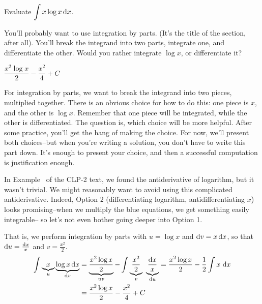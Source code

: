 \begin{Mquestion}[M121 2014A]\label{1.7_xlogx}
Evaluate ${\displaystyle\int x\log x\,\mathrm{d}x}$.
\end{Mquestion}

\begin{hint}
You'll probably want to use integration by parts. (It's the title of the section, after all). You'll break the integrand into two parts, integrate one, and differentiate the other. Would you rather integrate $\log x$, or differentiate it?
\end{hint}

\begin{answer}
$\dfrac{x^2\log x}{2} - \dfrac{x^2}{4} + C$
\end{answer}

\begin{solution}
For integration by parts, we want to break the integrand into two pieces, multiplied together. There is an obvious choice for how to do this: one piece is $x$, and the other is $\log x$. Remember that one piece will be integrated, while the other is differentiated. The question is, which choice will be more helpful. After some practice, you'll get the hang of making the choice. For now, we'll present both choices--but when you're writing a solution, you don't have to write this part down. It's enough to present your choice, and then a successful computation is justification enough.


In Example~ of the CLP-2 text, we found the antiderivative of logarithm, but it wasn't trivial. We might reasonably want to avoid using this complicated antiderivative. Indeed,  Option 2 (differentiating logarithm, antidifferentiating $x$) looks promising--when we multiply the blue equations, we get something easily integrable-- so let's not even bother going deeper into Option 1.

That is, we perform integration by parts with $u=\log x$ and $\mathrm{d}v=x\,\mathrm{d}x$,
so that $\mathrm{d}u=\frac{\mathrm{d}x}{x}$ and $v = \frac{x^2}{2}$.
\begin{align*}
\int\underbrace{ x}_{u}\underbrace{\log x\,\mathrm{d}x}_{\mathrm{d}v}
   &= \underbrace{\frac{x^2\log x}{2}}_{uv} - \int \underbrace{\frac{x^2}{2}}_v\ \underbrace{\frac{\mathrm{d}x}{x}}_{\mathrm{d}u}
    = \frac{x^2\log x}{2} -\frac{1}{2} \int x \ \mathrm{d}x \\
   &= \frac{x^2\log x}{2} - \frac{x^2}{4} + C
\end{align*}
\end{solution}

